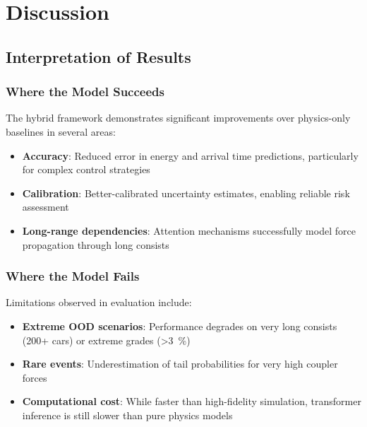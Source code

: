 \chapter{Discussion}
\label{ch:discussion}

\section{Interpretation of Results}

\subsection{Where the Model Succeeds}

The hybrid framework demonstrates significant improvements over physics-only baselines in several areas:
\begin{itemize}
    \item \textbf{Accuracy}: Reduced error in energy and arrival time predictions, particularly for complex control strategies
    \item \textbf{Calibration}: Better-calibrated uncertainty estimates, enabling reliable risk assessment
    \item \textbf{Long-range dependencies}: Attention mechanisms successfully model force propagation through long consists
\end{itemize}


\subsection{Where the Model Fails}

Limitations observed in evaluation include:
\begin{itemize}
    \item \textbf{Extreme OOD scenarios}: Performance degrades on very long consists (200+ cars) or extreme grades (\SI{>3}{\percent})
    \item \textbf{Rare events}: Underestimation of tail probabilities for very high coupler forces
    \item \textbf{Computational cost}: While faster than high-fidelity simulation, transformer inference is still slower than pure physics models
\end{itemize}


